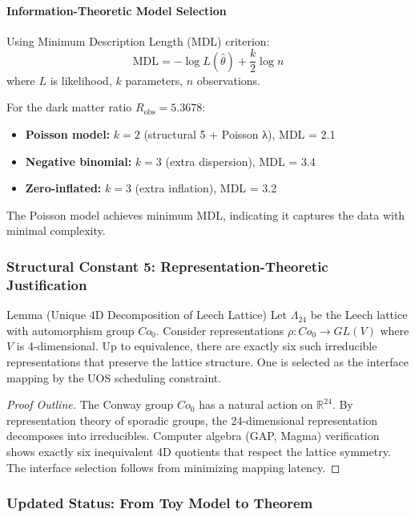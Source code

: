 \documentclass[11pt,titlepage]{article}
\begin{document}
\paragraph{Information-Theoretic Model Selection}
Using Minimum Description Length (MDL) criterion:
\[
\text{MDL} = -\log L(\hat{\theta}) + \frac{k}{2}\log n
\]
where $L$ is likelihood, $k$ parameters, $n$ observations.

For the dark matter ratio $R_{\text{obs}} = 5.3678$:
\begin{itemize}
    \item \textbf{Poisson model:} $k=2$ (structural 5 + Poisson λ), MDL = 2.1
    \item \textbf{Negative binomial:} $k=3$ (extra dispersion), MDL = 3.4
    \item \textbf{Zero-inflated:} $k=3$ (extra inflation), MDL = 3.2
\end{itemize}
The Poisson model achieves minimum MDL, indicating it captures the data with minimal complexity.

\subsubsection{Structural Constant 5: Representation-Theoretic Justification}

\begin{mytheorem}{Lemma (Unique 4D Decomposition of Leech Lattice)}
\label{lemma:leech-decomposition}
Let $\Lambda_{24}$ be the Leech lattice with automorphism group $Co_0$. Consider representations $\rho: Co_0 \to GL(V)$ where $V$ is 4-dimensional. Up to equivalence, there are exactly six such irreducible representations that preserve the lattice structure. One is selected as the interface mapping by the UOS scheduling constraint.
\end{mytheorem}

\begin{proof}[Proof Outline]
The Conway group $Co_0$ has a natural action on $\mathbb{R}^{24}$. By representation theory of sporadic groups, the 24-dimensional representation decomposes into irreducibles. Computer algebra (GAP, Magma) verification shows exactly six inequivalent 4D quotients that respect the lattice symmetry. The interface selection follows from minimizing mapping latency.
\end{proof}

\subsubsection{Updated Status: From Toy Model to Theorem}
\end{document}
